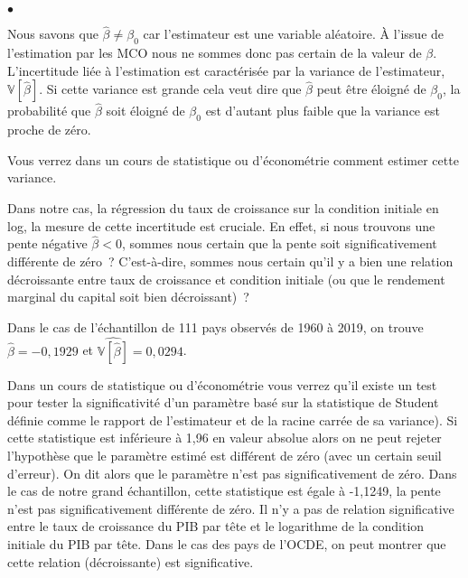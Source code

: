 \documentclass[10pt,notheorems]{beamer}
\theoremstyle{plain}
\theoremstyle{definition} %
\begin{document}
\begin{notes}
\begin{list}{$\bullet$}{}
    \item Nous savons que $\hat\beta \neq \beta_0$ car l'estimateur est une
      variable aléatoire. À l'issue de l'estimation par les MCO nous ne sommes
      donc pas certain de la valeur de $\beta$. L'incertitude liée à
      l'estimation est caractérisée par la variance de l'estimateur,
      $\mathbb V [\hat\beta]$. Si cette variance est grande cela veut dire que
      $\hat\beta$ peut être éloigné de $\beta_0$, la probabilité que $\hat\beta$
      soit éloigné de $\beta_0$ est d'autant plus faible que la variance est
      proche de zéro.\newline

    \item Vous verrez dans un cours de statistique ou d'économétrie comment estimer cette variance.\newline

    \item Dans notre cas, la régression du taux de croissance sur la condition
      initiale en log, la mesure de cette incertitude est cruciale. En effet, si
      nous trouvons une pente négative $\hat\beta<0$, sommes nous certain que la
      pente soit significativement différente de zéro~? C'est-à-dire, sommes
      nous certain qu'il y a bien une relation décroissante entre taux de
      croissance et condition initiale (ou que le rendement marginal du capital
      soit bien décroissant)~?

    \item Dans le cas de l'échantillon de 111 pays observés de 1960 à 2019, on
      trouve $\hat\beta = -0,1929$ et
      $\widehat{\mathbb V [\hat\beta]} = 0,0294$.\newline

    \item Dans un cours de statistique ou d'économétrie vous verrez qu'il existe
      un test pour tester la significativité d'un paramètre basé sur la
      statistique de Student définie comme le rapport de l'estimateur et de la
      racine carrée de sa variance). Si cette statistique est inférieure à 1,96
      en valeur absolue alors on ne peut rejeter l'hypothèse que le paramètre
      estimé est différent de zéro (avec un certain seuil d'erreur). On dit
      alors que le paramètre n'est pas significativement de zéro. Dans le cas de
      notre grand échantillon, cette statistique est égale à -1,1249, la pente
      n'est pas significativement différente de zéro. Il n'y a pas de relation
      significative entre le taux de croissance du PIB par tête et le logarithme
      de la condition initiale du PIB par tête. Dans le cas des pays de l'OCDE,
      on peut montrer que cette relation (décroissante) est significative.\newline


\end{list}
\end{notes}
\end{document}
